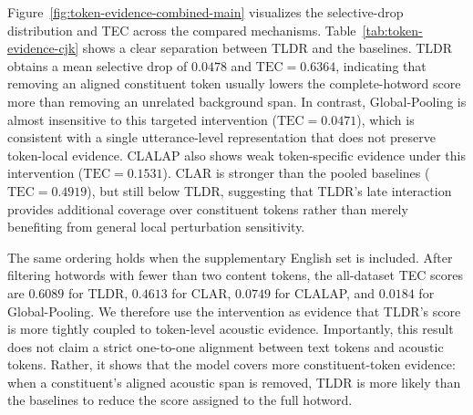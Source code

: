 \documentclass[letterpaper]{article} %
\begin{document}
Figure~\ref{fig:token-evidence-combined-main} visualizes the selective-drop
distribution and TEC across the compared mechanisms. Table~\ref{tab:token-evidence-cjk}
shows a clear separation between TLDR and the baselines. TLDR obtains a mean
selective drop of $0.0478$ and
$\mathrm{TEC}=0.6364$, indicating that removing an aligned constituent token
usually lowers the complete-hotword score more than removing an unrelated
background span. In contrast, Global-Pooling is almost insensitive to this
targeted intervention ($\mathrm{TEC}=0.0471$), which is consistent with a
single utterance-level representation that does not preserve token-local
evidence. CLALAP also shows weak token-specific evidence under this
intervention ($\mathrm{TEC}=0.1531$). CLAR is stronger than the pooled
baselines ($\mathrm{TEC}=0.4919$), but still below TLDR, suggesting that
TLDR's late interaction provides additional coverage over constituent tokens
rather than merely benefiting from general local perturbation sensitivity.

The same ordering holds when the supplementary English set is included. After
filtering hotwords with fewer than two content tokens, the all-dataset TEC
scores are $0.6089$ for TLDR, $0.4613$ for CLAR, $0.0749$ for CLALAP, and
$0.0184$ for Global-Pooling. We therefore use the intervention as evidence
that TLDR's score is more tightly coupled to token-level acoustic evidence.
Importantly, this result does not claim a strict one-to-one alignment between
text tokens and acoustic tokens. Rather, it shows that the model covers more
constituent-token evidence: when a constituent's aligned acoustic span is
removed, TLDR is more likely than the baselines to reduce the score assigned
to the full hotword.




% 
\end{document}
